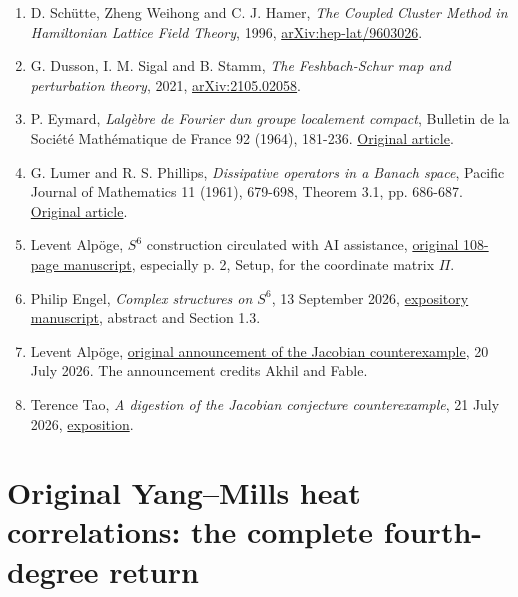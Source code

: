 \documentclass[11pt,a4paper]{article}
\let\originalsection\section
\renewcommand{\section}{\clearpage\originalsection}
\renewcommand{\[}{\begingroup\small\originaldisplaystart}
\renewcommand{\]}{\originaldisplayend\endgroup}
\begin{document}
\begin{enumerate}
\def\labelenumi{\arabic{enumi}.}
\item
  D. Schütte, Zheng Weihong and C. J. Hamer, \emph{The Coupled Cluster
  Method in Hamiltonian Lattice Field Theory}, 1996,
  \href{https://arxiv.org/abs/hep-lat/9603026}{{a\allowbreak{}r\allowbreak{}X\allowbreak{}i\allowbreak{}v\allowbreak{}:\allowbreak{}h\allowbreak{}e\allowbreak{}p\allowbreak{}-\allowbreak{}l\allowbreak{}a\allowbreak{}t\allowbreak{}/\allowbreak{}9\allowbreak{}6\allowbreak{}0\allowbreak{}3\allowbreak{}0\allowbreak{}2\allowbreak{}6\allowbreak{}}}.
\item
  G. Dusson, I. M. Sigal and B. Stamm, \emph{The Feshbach-Schur map and
  perturbation theory}, 2021,
  \href{https://arxiv.org/abs/2105.02058}{arXiv:2105.02058}.
\item
  P. Eymard, \emph{L\textquotesingle algèbre de Fourier
  d\textquotesingle un groupe localement compact}, Bulletin de la
  Société Mathématique de France 92 (1964), 181-236.
  \href{https://www.numdam.org/item/BSMF_1964__92__181_0/}{Original
  article}.
\item
  G. Lumer and R. S. Phillips, \emph{Dissipative operators in a Banach
  space}, Pacific Journal of Mathematics 11 (1961), 679-698, Theorem
  3.1, pp. 686-687.
  \href{https://msp.org/pjm/1961/11-2/pjm-v11-n2-p19-s.pdf}{Original
  article}.
\item
  Levent Alpöge, \(S^6\) construction circulated with AI assistance,
  \href{https://alpo.ge/s6.pdf}{original 108-page manuscript},
  especially p. 2, Setup, for the coordinate matrix \(\Pi\).
\item
  Philip Engel, \emph{Complex structures on \(S^6\)}, 13 September 2026,
  \href{https://philip-engel.github.io/S6.pdf}{expository manuscript},
  abstract and Section 1.3.
\item
  Levent Alpöge,
  \href{https://x.com/__alpoge__/status/2079028340955197566}{original
  announcement of the Jacobian counterexample}, 20 July 2026. The
  announcement credits Akhil and Fable.
\item
  Terence Tao, \emph{A digestion of the Jacobian conjecture
  counterexample}, 21 July 2026,
  \href{https://terrytao.wordpress.com/2026/07/21/a-digestion-of-the-jacobian-conjecture-counterexample/}{exposition}.
\end{enumerate}

\clearpage
\appendix

\section{Original Yang--Mills heat correlations: the complete
fourth-degree
return}\label{original-yangmills-heat-correlations-the-complete-fourth-degree-return}
\end{document}
